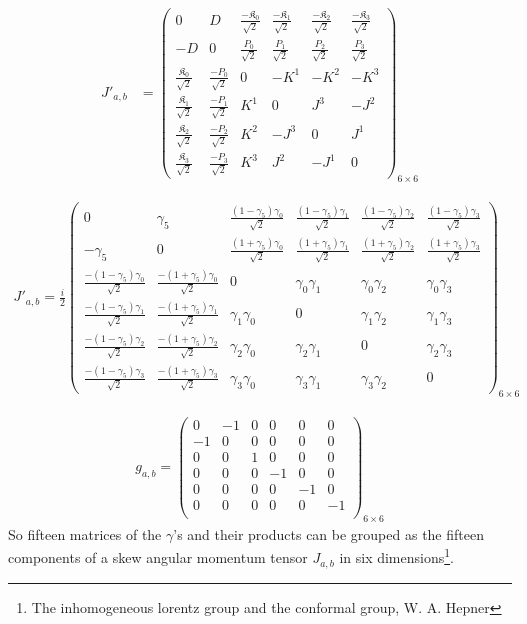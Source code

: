 \documentclass[]{article}
\numberwithin{equation}{section}
\begin{document}
{{\begin{align}
  J'_{a,b}&=
  \begin{pmatrix}
  0&D&\frac{-\mathfrak{K}_0}{\sqrt{2}}&\frac{-\mathfrak{K}_1}{\sqrt{2}}&\frac{-\mathfrak{K}_2}{\sqrt{2}}&\frac{-\mathfrak{K}_3}{\sqrt{2}}\\
  -D&0&\frac{P_0}{\sqrt{2}}&\frac{P_1}{\sqrt{2}}&\frac{P_2}{\sqrt{2}}&\frac{P_3}{\sqrt{2}}\\
    \frac{\mathfrak{K}_0}{\sqrt{2}}&\frac{-P_0}{\sqrt{2}}&0 & -K^{1} & -K^{2} & -K^{3}\\
    \frac{\mathfrak{K}_1}{\sqrt{2}}&\frac{-P_1}{\sqrt{2}}&K^{1} & 0 & J^{3} & -J^{2}\\
    \frac{\mathfrak{K}_2}{\sqrt{2}}&\frac{-P_2}{\sqrt{2}}&K^{2} & -J^{3} & 0 & J^{1}\\
    \frac{\mathfrak{K}_3}{\sqrt{2}}&\frac{-P_3}{\sqrt{2}}&K^{3} & J^{2} & -J^{1} & 0
  \end{pmatrix}_{6\times6}
\end{align}

\begin{align}
  \boxed{J'_{a,b}=\frac{i}{2}
  \begin{pmatrix}
  0&\gamma_5&\frac{(1-\gamma_5)\gamma_0}{\sqrt{2}}&\frac{(1-\gamma_5)\gamma_1}{\sqrt{2}}&\frac{(1-\gamma_5)\gamma_2}{\sqrt{2}}&\frac{(1-\gamma_5)\gamma_3}{\sqrt{2}}\\
  -\gamma_5&0&\frac{(1+\gamma_5)\gamma_0}{\sqrt{2}}&\frac{(1+\gamma_5)\gamma_1}{\sqrt{2}}&\frac{(1+\gamma_5)\gamma_2}{\sqrt{2}}&\frac{(1+\gamma_5)\gamma_3}{\sqrt{2}}\\
    \frac{-(1-\gamma_5)\gamma_0}{\sqrt{2}}&\frac{-(1+\gamma_5)\gamma_0}{\sqrt{2}}&0 & \gamma_0\gamma_1 & \gamma_0\gamma_2 & \gamma_0\gamma_3\\
   \frac{-(1-\gamma_5)\gamma_1}{\sqrt{2}}&\frac{-(1+\gamma_5)\gamma_1}{\sqrt{2}}&\gamma_1\gamma_0 & 0 & \gamma_1\gamma_2 & \gamma_1\gamma_3\\
    \frac{-(1-\gamma_5)\gamma_2}{\sqrt{2}}&\frac{-(1+\gamma_5)\gamma_2}{\sqrt{2}}&\gamma_2\gamma_0 & \gamma_2\gamma_1 & 0 & \gamma_2\gamma_3\\
    \frac{-(1-\gamma_5)\gamma_3}{\sqrt{2}}&\frac{-(1+\gamma_5)\gamma_3}{\sqrt{2}}&\gamma_3\gamma_0 & \gamma_3\gamma_1 & \gamma_3\gamma_2 & 0
  \end{pmatrix}_{6\times6}}
\end{align}

  \begin{align}
      g_{a,b}=\begin{pmatrix}
  0&-1&0&0&0&0\\
  -1&0&0&0&0&0\\
  0&0&1&0&0&0\\
  0&0&0&-1&0&0\\
  0&0&0&0&-1&0\\
  0&0&0&0&0&-1\\
  \end{pmatrix}_{6\times6}
  \end{align}
So fifteen matrices of the $\gamma$'s and their products can be grouped as the fifteen components of a skew angular momentum tensor
$J_{a,b}$ in six dimensions\footnote{The inhomogeneous lorentz group and the conformal group,
W. A. Hepner}.

}}
\end{document}
